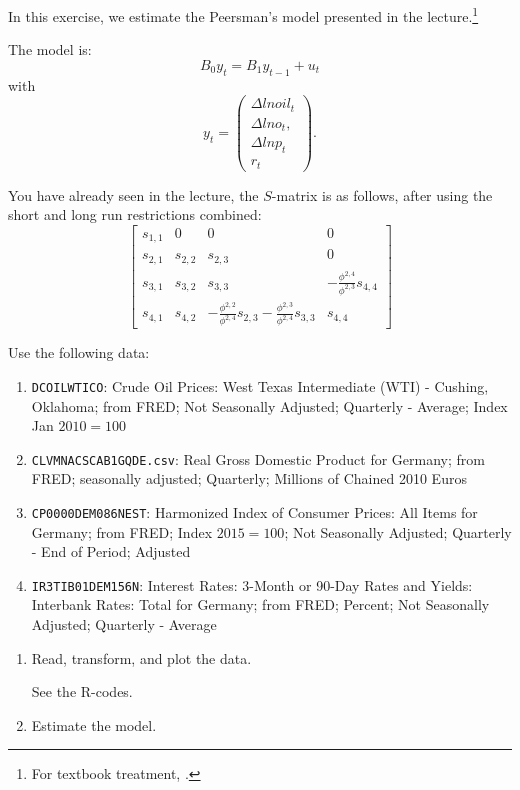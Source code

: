 In this exercise, we estimate the Peersman's model presented in the lecture.\footnote{For textbook treatment, \cite[][see page 535]{MartinHurnHarris-2012}.}

The model is:
\[ B_0 y_t = B_1 y_{t-1} + u_t \]
with
\[
    y_t = \begin{pmatrix}
        \Delta ln oil_t \\ \Delta ln o_t, \\ \Delta ln p_t \\ r_t
    \end{pmatrix}.
\]

You have already seen in the lecture, the $S$-matrix is as follows, after using the short and long run restrictions combined:
\[
    \begin{bmatrix}
        s_{1, 1}
         & 0
         & 0
         & 0
        \\
        s_{2, 1}
         & s_{2, 2}
         & s_{2, 3}
         & 0
        \\
        s_{3, 1}
         & s_{3, 2}
         & s_{3, 3}
         & -\frac{\phi^{2, 4}}{\phi^{2, 3}} s_{4, 4}
        \\
        s_{4, 1}
         & s_{4, 2}
         & -\frac{\phi^{2, 2}}{\phi^{2, 4}} s_{2, 3}
        -\frac{\phi^{2, 3}}{\phi^{2, 4}} s_{3, 3}
         & s_{4, 4}
    \end{bmatrix}
\]

Use the following data:
\begin{enumerate}[label=--]
    \item \verb|DCOILWTICO|: Crude Oil Prices: West Texas Intermediate (WTI) - Cushing, Oklahoma; from FRED; Not Seasonally Adjusted; Quarterly - Average; Index Jan $2010=100$

    \item \verb|CLVMNACSCAB1GQDE.csv|: Real Gross Domestic Product for Germany; from FRED; seasonally adjusted; Quarterly; Millions of Chained 2010 Euros

    \item \verb|CP0000DEM086NEST|: Harmonized Index of Consumer Prices: All Items for Germany; from FRED; Index $2015=100$; Not Seasonally Adjusted; Quarterly - End of Period; Adjusted

    \item \verb|IR3TIB01DEM156N|: Interest Rates: 3-Month or 90-Day Rates and Yields: Interbank Rates: Total for Germany; from FRED; Percent; Not Seasonally Adjusted; Quarterly - Average
\end{enumerate}


\begin{enumerate}
    \item Read, transform, and plot the data.

          \begin{sol}
              See the R-codes.
          \end{sol}

    \item Estimate the model.

          \begin{sol}
              
          \end{sol}
\end{enumerate}